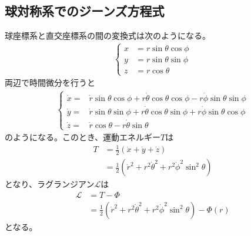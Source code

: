 \subsection{球対称系でのジーンズ方程式}
球座標系と直交座標系の間の変換式は次のようになる。
\begin{align}
	\begin{cases}
		x &= r\sin\theta \cos\phi \\
		y &= r\sin\theta \sin\phi \\
		z &= r\cos\theta
	\end{cases}
\end{align}
両辺で時間微分を行うと
\begin{align}
	\begin{cases}
		\dot{x} =& \dot{r}\sin{\theta} \cos{\phi} + r\dot{\theta}\cos{\theta} \cos{\phi} - r\dot{\phi}\sin\theta \sin\phi \\
		\dot{y} =& \dot{r}\sin{\theta} \sin{\phi} + r\dot{\theta}\cos{\theta} \sin{\phi} + r\dot{\phi}\sin{\theta} \cos{\phi} \\
		\dot{z} =& \dot{r}\cos{\theta} - r\dot{\theta}\sin{\theta}
	\end{cases}
\end{align}
のようになる。このとき、運動エネルギー$T$は
\begin{align}
	T &= \frac{1}{2}(\dot{x}+\dot{y}+\dot{z}) \\
	&= \frac{1}{2}(\dot{r}^2 + r^2\dot{\theta}^2 + r^2\dot{\phi}^2\sin^2\theta)
\end{align}
となり、ラグランジアン$\mathcal{L}$は
\begin{align}
	\mathcal{L} &= T - \Phi \\
	&= \frac{1}{2}(\dot{r}^2 + r^2\dot{\theta}^2 + r^2\dot{\phi}^2\sin^2\theta) - \Phi(r)
\end{align}
となる。

